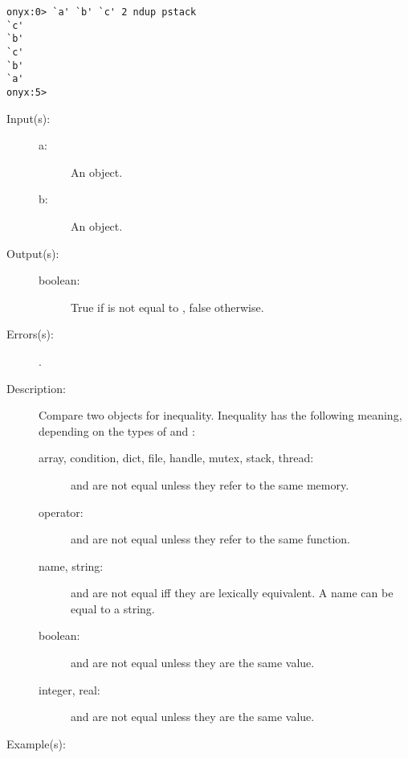 \begin{description}
\begin{description}
\begin{verbatim}
onyx:0> `a' `b' `c' 2 ndup pstack
`c'
`b'
`c'
`b'
`a'
onyx:5>
		\end{verbatim}
	\end{description}
\label{systemdict:ne}
\item[{\onyxop{a b}{ne}{boolean}}: ]
	\begin{description}\item[]
	\item[Input(s): ]
		\begin{description}\item[]
		\item[a: ]
			An object.
		\item[b: ]
			An object.
		\end{description}
	\item[Output(s): ]
		\begin{description}\item[]
		\item[boolean: ]
			True if  is not equal to , false
			otherwise.
		\end{description}
	\item[Errors(s): ]
		\begin{description}\item[]
		\item[.]
		\end{description}
	\item[Description: ]
		Compare two objects for inequality.  Inequality has the
		following meaning, depending on the types of  and
		:
		\begin{description}
		\item[array, condition, dict, file, handle, mutex, stack,
		thread: ]  and  are not equal unless they
		refer to the same memory.
		\item[operator: ]  and  are not equal unless
		they refer to the same function.
		\item[name, string: ]  and  are not equal iff
		they are lexically equivalent.  A name can be equal to a string.
		\item[boolean: ]  and  are not equal unless
		they are the same value.
		\item[integer, real: ]  and  are not equal
		unless they are the same value.
		\end{description}
	\item[Example(s): ]\begin{verbatim}


\end{verbatim}
\end{description}
\end{description}
